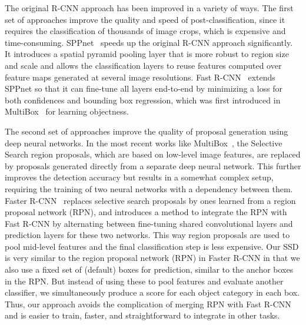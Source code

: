 \documentclass[runningheads]{llncs}
\begin{document}
The original R-CNN approach has been improved in a variety of ways. The first set of approaches improve the quality and speed of post-classification, since it requires the classification of thousands of image crops, which is expensive and time-consuming. SPPnet~\cite{he2014spatial} speeds up the original R-CNN approach significantly. It introduces a spatial pyramid pooling layer that is more robust to region size and scale and allows the classification layers to reuse features computed over feature maps generated at several image resolutions. Fast R-CNN~\cite{girshick2015fast} extends SPPnet so that it can fine-tune all layers end-to-end by minimizing a loss for both confidences and bounding box regression, which was first introduced in MultiBox~\cite{erhan2014scalable} for learning objectness.

The second set of approaches improve the quality of proposal generation using deep neural networks. In the most recent works like MultiBox~\cite{erhan2014scalable,szegedy2014scalable}, the Selective Search region proposals, which are based on low-level image features, are replaced by proposals generated directly from a separate deep neural network. This further improves the detection accuracy but results in a somewhat complex setup, requiring the training of two neural networks with a dependency between them. Faster R-CNN~\cite{ren2015faster} replaces selective search proposals by ones learned from a region proposal network (RPN), and introduces a method to integrate the RPN with Fast R-CNN by alternating between fine-tuning shared convolutional layers and prediction layers for these two networks.  This way region proposals are used to pool mid-level features and the final classification step is less expensive.  Our SSD is very similar to the region proposal network (RPN) in Faster R-CNN in that we also use a fixed set of (default) boxes for prediction, similar to the anchor boxes in the RPN.  But instead of using these to pool features and evaluate another classifier, we simultaneously produce a score for each object category in each box. Thus, our approach avoids the complication of merging RPN with Fast R-CNN and is easier to train, faster, and straightforward to integrate in other tasks.
\end{document}
